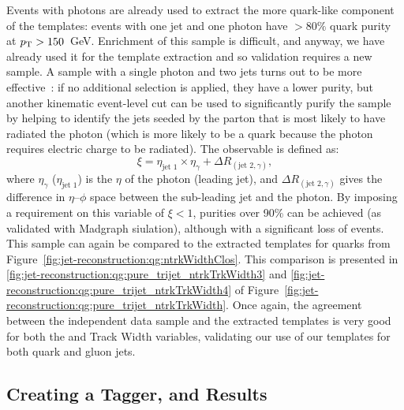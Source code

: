 Events with photons are already used to extract the more quark-like component of the templates: events with one jet and one photon have $>80\%$ quark purity at $p_{\text{T}} > 150$~GeV. Enrichment of this sample is difficult, and anyway, we have already used it for the template extraction and so validation requires a new sample. A sample with a single photon and two jets turns out to be more effective~\cite{schwartz2}: if no additional selection is applied, they have a lower purity, but another kinematic event-level cut can be used to significantly purify the sample by helping to identify the jets seeded by the parton that is most likely to have radiated the photon (which is more likely to be a quark because the photon requires electric charge to be radiated). The observable is defined as:
%
\begin{equation}
\xi=\eta_\text{jet~1}\times\eta_\gamma+\Delta R_{(\text{jet~2},\gamma)},
\end{equation}
%
where $\eta_\gamma$ ($\eta_\text{jet~1}$) is the $\eta$ of the photon (leading jet), and 
$\Delta R_{(\text{jet~2},\gamma)}$ gives the difference in $\eta$--$\phi$ space between the sub-leading 
jet and the photon. By imposing a requirement on this variable of $\xi < 1$, purities over 90\% can be achieved (as validated with {\sc Madgraph} siulation), although with a significant loss of events. This sample can again be compared to the extracted templates for quarks from Figure~\ref{fig:jet-reconstruction:qg:ntrkWidthClos}. This comparison is presented in \ref{fig:jet-reconstruction:qg:pure_trijet_ntrkTrkWidth3} and \ref{fig:jet-reconstruction:qg:pure_trijet_ntrkTrkWidth4} of Figure~\ref{fig:jet-reconstruction:qg:pure_trijet_ntrkTrkWidth}. Once again, the agreement between the independent data sample and the extracted templates is very good for both the \ntrk and Track Width variables, validating our use of our templates for both quark and gluon jets.

\subsection{Creating a Tagger, and Results}

